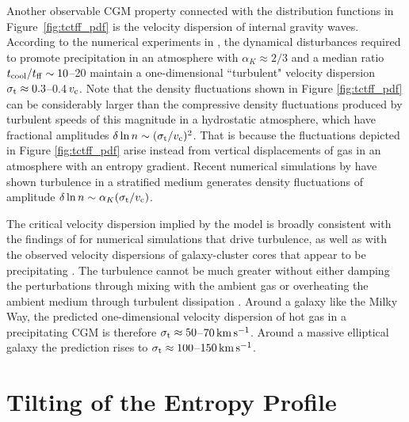 \documentclass[twocolumn]{aastex63}
\begin{document}
Another observable CGM property connected with the distribution functions in Figure~\ref{fig:tctff_pdf} is the velocity dispersion of internal gravity waves.   According to the numerical experiments in \citet{Voit_2018ApJ...868..102V}, 
the dynamical disturbances required to promote precipitation in an atmosphere with $\alpha_K \approx 2/3$ and a median ratio $t_{\rm cool} / t_{\rm ff} \sim 10$--20 maintain a one-dimensional ``turbulent" velocity dispersion $\sigma_{\rm t} \approx 0.3$--0.4$ \, v_{\rm c}$.  Note that the density fluctuations shown in Figure \ref{fig:tctff_pdf} can be considerably larger than the compressive density fluctuations produced by turbulent speeds of this magnitude in a hydrostatic atmosphere, which have fractional amplitudes $\delta \ln n \sim (\sigma_{\rm t}/v_{\rm c})^2$.  That is because the fluctuations depicted in Figure \ref{fig:tctff_pdf} arise instead from vertical displacements of gas in an atmosphere with an entropy gradient. Recent numerical simulations by \citet{Mohapatra_2020,Mohapatra_2021} have shown turbulence in a stratified medium generates density fluctuations of amplitude $\delta \ln n \sim \alpha_K (\sigma_{\rm t}/v_{\rm c})$.  

The critical velocity dispersion implied by the \citet{Voit_2018ApJ...868..102V} model is broadly consistent with the findings of \citet{Gaspari+2013MNRAS.432.3401G} for numerical simulations that drive turbulence, as well as with the observed velocity dispersions of galaxy-cluster cores that appear to be precipitating \citep{Gaspari_2018ApJ...854..167G}.  The turbulence cannot be much greater without either damping the perturbations through mixing with the ambient gas or overheating the ambient medium through turbulent dissipation \citep{Gaspari+2013MNRAS.432.3401G,Gaspari_2017MNRAS.466..677G,BanerjeeSharma_2014MNRAS.443..687B,Buie_2018ApJ...864..114B,Buie_stratified_2020ApJ...896..136B}.  Around a galaxy like the Milky Way, the predicted one-dimensional velocity dispersion of hot gas in a precipitating CGM is therefore $\sigma_{\rm t} \approx 50$--$70 \, {\rm km \,s^{-1}}$.  Around a massive elliptical galaxy the prediction rises to $\sigma_{\rm t} \approx 100$--$150 \, {\rm km \,s^{-1}}$.

\section{Tilting of the Entropy Profile}
\label{sec:tilting}
\end{document}
